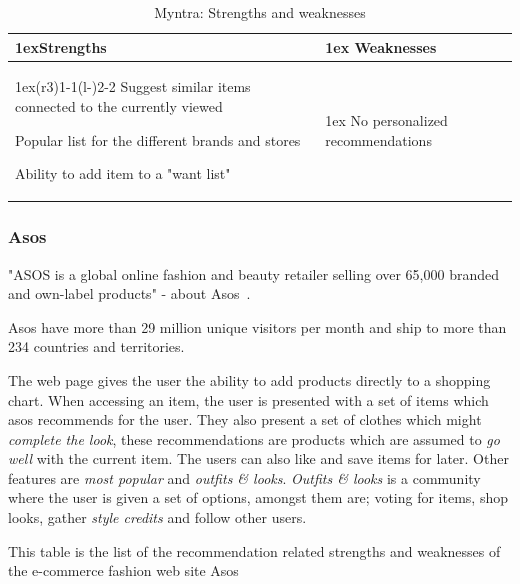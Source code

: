 \begin{table}[H]
    \centering
    \begin{tabularx}{\linewidth}{>{\parskip1ex}X@{\kern4\tabcolsep}>{\parskip1ex}X}
        \toprule
        \hfil\bfseries Strengths
        &
        \hfil\bfseries Weaknesses
        \\\cmidrule(r{3\tabcolsep}){1-1}\cmidrule(l{-\tabcolsep}){2-2}
        Suggest similar items connected to the currently viewed \par
        Popular list for the different brands and stores \par
        Ability to add item to a "want list"\par
        &
        No personalized recommendations \par
        \\\bottomrule
    \end{tabularx}
    \caption{Myntra: Strengths and weaknesses}
    \label{table:ecommerceMyntra}
\end{table}

\subsubsection{Asos}
\label{par:Asos}

"ASOS is a global online fashion and beauty retailer selling over 65,000 branded and own-label products" -
about Asos~\cite{asos}.

Asos have more than 29 million unique visitors per month and ship to more than 234 countries and territories.

The web page gives the user the ability to add products directly to a shopping chart.
When accessing an item, the user is presented with a set of items which asos recommends for the user.
They also present a set of clothes which might \emph{complete the look}, these recommendations are products which are assumed to \emph{go well} with the current item.
The users can also like and save items for later.
Other features are \emph{most popular} and \emph{outfits \& looks}.
\emph{Outfits \& looks} is a community where the user is given a set of options, amongst them are; voting for items, shop looks, gather \emph{style credits} and follow other users.

This table is the list of the recommendation related strengths and weaknesses
of the e-commerce fashion web site Asos~\cite{asos}

